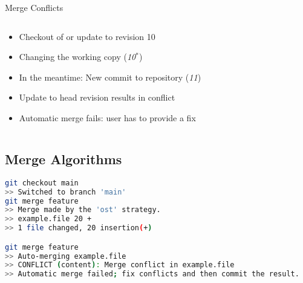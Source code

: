 \begin{frame}[fragile]{Merge Conflicts}
\begin{columns}[T, onlytextwidth]
\begin{column}{0.6\linewidth}
			\begin{example}{}
				\begin{itemize}
					\item<1-> Checkout of or update to revision 10
					\item<2-> Changing the working copy (\emph{10$^*$})
					\item<3-> In the meantime: New commit to repository (\emph{11})
					\item<4-> Update to head revision results in conflict
					\item<4-> Automatic merge fails: user has to provide a fix
				\end{itemize}			
			\end{example}
		\end{column}
		\begin{column}{0.5\linewidth}
		\end{column}
	\end{columns}
\end{frame}

\subsection{Merge Algorithms}
\begin{frame}[fragile]{\insertsubsection}
	\begin{fancycolumns}[animation=none, widths={30}]
		
		\begin{lstlisting}[language=bash, basicstyle=\small, breaklines=true, numbers=none, escapechar=*]
git checkout main
>> Switched to branch 'main'
git merge feature
>> Merge made by the 'ost' strategy.
>> example.file 20 +
>> 1 file changed, 20 insertion(+)

git merge feature
>> Auto-merging example.file
>> CONFLICT (content): Merge conflict in example.file
>> Automatic merge failed; fix conflicts and then commit the result.
		\end{lstlisting}
		
		\nextcolumn
		\begin{center}
		\end{center}
	\end{fancycolumns}
\end{frame}

